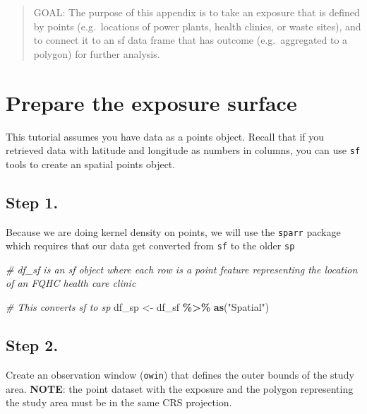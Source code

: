 \documentclass[
]{book}
\newenvironment{Shaded}{\begin{snugshade}}{\end{snugshade}}
\newcommand{\CommentTok}[1]{\textcolor[rgb]{0.56,0.35,0.01}{\textit{#1}}}
\newcommand{\FunctionTok}[1]{\textcolor[rgb]{0.13,0.29,0.53}{\textbf{#1}}}
\newcommand{\NormalTok}[1]{#1}
\newcommand{\OtherTok}[1]{\textcolor[rgb]{0.56,0.35,0.01}{#1}}
\newcommand{\SpecialCharTok}[1]{\textcolor[rgb]{0.81,0.36,0.00}{\textbf{#1}}}
\newcommand{\StringTok}[1]{\textcolor[rgb]{0.31,0.60,0.02}{#1}}
\begin{document}
\begin{quote}
GOAL: The purpose of this appendix is to take an exposure that is defined by points (e.g.~locations of power plants, health clinics, or waste sites), and to connect it to an sf data frame that has outcome (e.g.~aggregated to a polygon) for further analysis.
\end{quote}

\hypertarget{prepare-the-exposure-surface}{%
\section{Prepare the exposure surface}\label{prepare-the-exposure-surface}}

This tutorial assumes you have data as a points object. Recall that if you retrieved data with latitude and longitude as numbers in columns, you can use \texttt{sf} tools to create an spatial points object.

\hypertarget{step-1.}{%
\subsection{Step 1.}\label{step-1.}}

Because we are doing kernel density on points, we will use the \texttt{sparr} package which requires that our data get converted from \texttt{sf} to the older \texttt{sp}

\begin{Shaded}
\begin{Highlighting}[]
\CommentTok{\# df\_sf is an sf object where each row is a point feature representing the location of an FQHC health care clinic}

\CommentTok{\# This converts sf to sp}
\NormalTok{df\_sp }\OtherTok{\textless{}{-}}\NormalTok{ df\_sf }\SpecialCharTok{\%\textgreater{}\%} \FunctionTok{as}\NormalTok{(}\StringTok{"Spatial"}\NormalTok{)}
\end{Highlighting}
\end{Shaded}

\hypertarget{step-2.}{%
\subsection{Step 2.}\label{step-2.}}

Create an observation window (\texttt{owin}) that defines the outer bounds of the study area. \textbf{NOTE}: the point dataset with the exposure and the polygon representing the study area must be in the same CRS projection.
\end{document}

